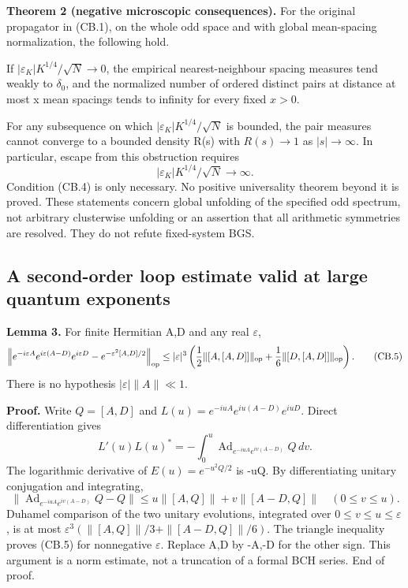 \textbf{Theorem 2 (negative microscopic consequences).} For the original propagator in (CB.1), on the whole odd space and with global mean-spacing normalization, the following hold.

If \(|\varepsilon_K|K^{1/4}/\sqrt N\to0\), the empirical nearest-neighbour spacing measures tend weakly to \(\delta_0\), and the normalized number of ordered distinct pairs at distance at most x mean spacings tends to infinity for every fixed \(x>0\).

For any subsequence on which \(|\varepsilon_K|K^{1/4}/\sqrt N\) is bounded, the pair measures cannot converge to a bounded density R(s) with \(R(s)\to1\) as \(|s|\to\infty\). In particular, escape from this obstruction requires \[
 |\varepsilon_K|K^{1/4}/\sqrt N\longrightarrow\infty.            \tag{CB.4}
\] Condition (CB.4) is only necessary. No positive universality theorem beyond it is proved. These statements concern global unfolding of the specified odd spectrum, not arbitrary clusterwise unfolding or an assertion that all arithmetic symmetries are resolved. They do not refute fixed-system BGS.

\subsection{A second-order loop estimate valid at large quantum exponents}\label{coboundary:a-second-order-loop-estimate-valid-at-large-quantum-exponents}

\textbf{Lemma 3.} For finite Hermitian A,D and any real \(\varepsilon\), \[
 \left\|e^{-i\varepsilon A}e^{i\varepsilon(A-D)}e^{i\varepsilon D}
       -e^{-\varepsilon^2[A,D]/2}\right\|_{\rm op}
 \leq |\varepsilon|^3\left(
       \frac12\|[A,[A,D]]\|_{\rm op}
       +\frac16\|[D,[A,D]]\|_{\rm op}\right).                  \tag{CB.5}
\] There is no hypothesis \(|\varepsilon|\|A\|\ll1\).

\textbf{Proof.} Write \(Q=[A,D]\) and \(L(u)=e^{-iuA}e^{iu(A-D)}e^{iuD}\). Direct differentiation gives \[
 L'(u)L(u)^*=-\int_0^u
       \operatorname{Ad}_{e^{-iuA}e^{iv(A-D)}}Q\,dv.
\] The logarithmic derivative of \(E(u)=e^{-u^2Q/2}\) is -uQ. By differentiating unitary conjugation and integrating, \[
 \|\operatorname{Ad}_{e^{-iuA}e^{iv(A-D)}}Q-Q\|
 \leq u\|[A,Q]\|+v\|[A-D,Q]\|\quad(0\leq v\leq u).
\] Duhamel comparison of the two unitary evolutions, integrated over \(0\leq v\leq u\leq\varepsilon\), is at most \(\varepsilon^3(\|[A,Q]\|/3+\|[A-D,Q]\|/6)\). The triangle inequality proves (CB.5) for nonnegative \(\varepsilon\). Replace A,D by -A,-D for the other sign. This argument is a norm estimate, not a truncation of a formal BCH series. End of proof.

